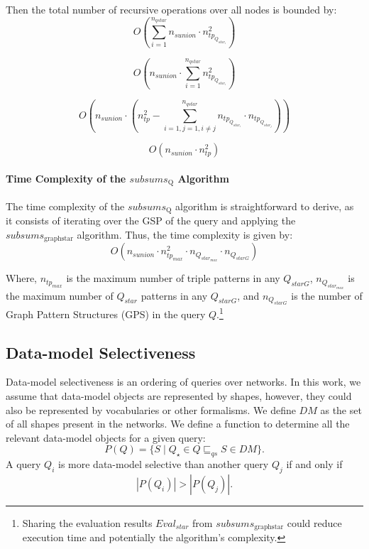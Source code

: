 Then the total number of recursive operations over all nodes is bounded by:
$$
O\left(\sum_{i=1}^{n_{qstar}} n_{sunion} \cdot n_{tp_{Q_{star_i}}}^{2}\right)
$$

$$
O\left(n_{sunion} \cdot \sum_{i=1}^{n_{qstar}} n_{tp_{Q_{star_i}}}^{2}\right)
$$

$$
O\left(n_{sunion} \cdot \left(n_{tp}^{2} - \sum_{i=1, j=1, i \neq j}^{n_{qstar}}  n_{tp_{Q_{star_i}}} \cdot  n_{tp_{Q_{star_j}}}\right)\right)
$$

$$
O\left(n_{sunion} \cdot n_{tp}^{2}\right)
$$

\paragraph{Time Complexity of the $subsums_{\mathrm{Q}}$ Algorithm}



The time complexity of the $subsums_{\mathrm{Q}}$ algorithm is straightforward to derive, as it consists of iterating over the GSP of the query and applying the $subsums_{\mathrm{graph star}}$ algorithm. Thus, the time complexity is given by:
\begin{equation}
O\left(n_{sunion} \cdot n_{tp_{max}}^{2} \cdot n_{Q_{star_{max}}} \cdot n_{Q_{starG}}\right)
\end{equation}

Where, $n_{tp_{max}}$ is the maximum number of triple patterns in any $Q_{starG}$,
$n_{Q_{star_{max}}}$ is the maximum number of $Q_{star}$ patterns in any $Q_{starG}$, and
$n_{Q_{starG}}$ is the number of Graph Pattern Structures (GPS) in the query $Q$.\footnote{
    Sharing the evaluation results $Eval_{star}$ from $subsums_{\mathrm{graph star}}$ could reduce execution time and potentially the algorithm's complexity.
}

\subsection{Data-model Selectiveness}
Data-model selectiveness is an ordering of queries over networks. 
In this work, we assume that data-model objects are represented by shapes, however, they could also be represented by vocabularies or other formalisms.
We define $DM$ as the set of all shapes present in the networks.
We define a function to determine all the relevant data-model objects for a given query:
\begin{equation}
   P(Q) = \{ S \mid Q_{\star} \in Q \sqsubseteq_{qs} S \in DM \}.
\end{equation}
A query $Q_i$ is more data-model selective than another query $Q_j$ if and only if 
\begin{equation}
    \left| P(Q_i) \right| > \left| P(Q_j) \right|.
\end{equation}

